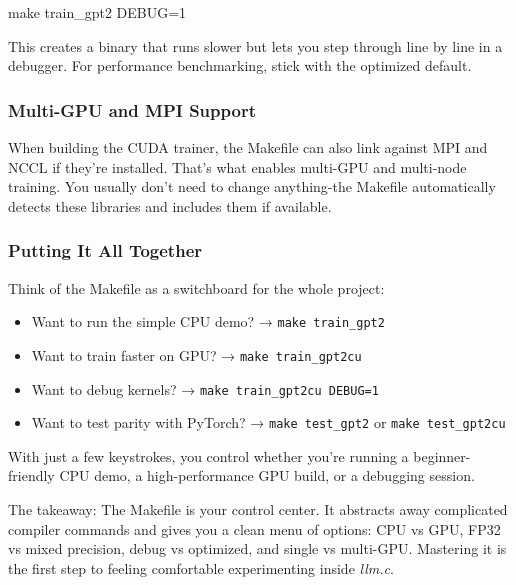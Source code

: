 \documentclass[
  letterpaper,
  DIV=11,
  numbers=noendperiod]{scrreprt}
\newenvironment{Shaded}{\begin{snugshade}}{\end{snugshade}}
\newcommand{\FunctionTok}[1]{\textcolor[rgb]{0.28,0.35,0.67}{#1}}
\newcommand{\NormalTok}[1]{\textcolor[rgb]{0.00,0.23,0.31}{#1}}
\providecommand{\tightlist}{%
  \setlength{\itemsep}{0pt}\setlength{\parskip}{0pt}}
\begin{document}
\begin{Shaded}
\begin{Highlighting}[]
\FunctionTok{make}\NormalTok{ train\_gpt2 DEBUG=1}
\end{Highlighting}
\end{Shaded}

This creates a binary that runs slower but lets you step through line by
line in a debugger. For performance benchmarking, stick with the
optimized default.

\subsubsection{Multi-GPU and MPI
Support}\label{multi-gpu-and-mpi-support}

When building the CUDA trainer, the Makefile can also link against MPI
and NCCL if they're installed. That's what enables multi-GPU and
multi-node training. You usually don't need to change anything-the
Makefile automatically detects these libraries and includes them if
available.

\subsubsection{Putting It All Together}\label{putting-it-all-together}

Think of the Makefile as a switchboard for the whole project:

\begin{itemize}
\tightlist
\item
  Want to run the simple CPU demo? → \texttt{make\ train\_gpt2}
\item
  Want to train faster on GPU? → \texttt{make\ train\_gpt2cu}
\item
  Want to debug kernels? → \texttt{make\ train\_gpt2cu\ DEBUG=1}
\item
  Want to test parity with PyTorch? → \texttt{make\ test\_gpt2} or
  \texttt{make\ test\_gpt2cu}
\end{itemize}

With just a few keystrokes, you control whether you're running a
beginner-friendly CPU demo, a high-performance GPU build, or a debugging
session.

The takeaway: The Makefile is your control center. It abstracts away
complicated compiler commands and gives you a clean menu of options: CPU
vs GPU, FP32 vs mixed precision, debug vs optimized, and single vs
multi-GPU. Mastering it is the first step to feeling comfortable
experimenting inside \emph{llm.c}.
\end{document}
